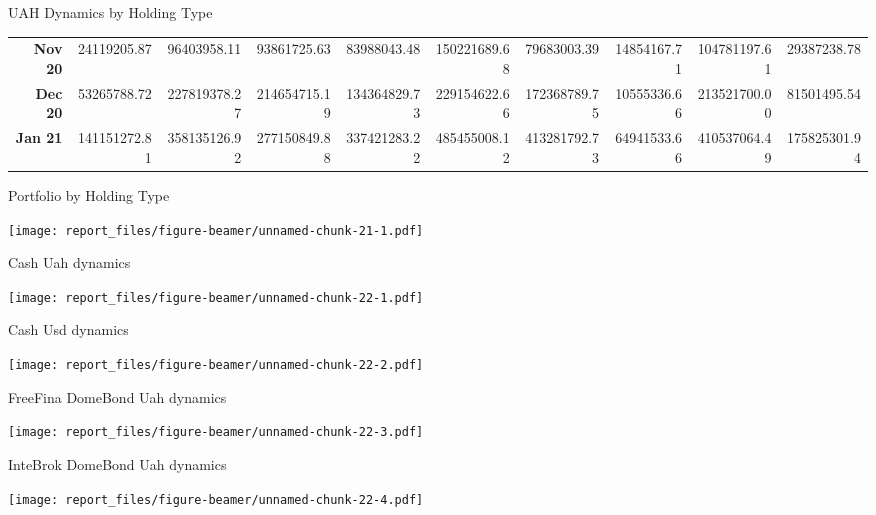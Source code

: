\documentclass[ignorenonframetext,]{beamer}
\begin{document}
\begin{frame}{UAH Dynamics by Holding Type}
\begin{table}[ht]
{\begin{tabular}{rrrrrrrrrr}
  {\textbf{Nov 20}} & 24119205.87 & 96403958.11 & 93861725.63 & 83988043.48 & 150221689.68 & 79683003.39 & 14854167.71 & 104781197.61 & 29387238.78 \\ 
  {\textbf{Dec 20}} & 53265788.72 & 227819378.27 & 214654715.19 & 134364829.73 & 229154622.66 & 172368789.75 & 10555336.66 & 213521700.00 & 81501495.54 \\ 
  {\textbf{Jan 21}} & 141151272.81 & 358135126.92 & 277150849.88 & 337421283.22 & 485455008.12 & 413281792.73 & 64941533.66 & 410537064.49 & 175825301.94 \\ 
   \hline
\end{tabular}
}
\end{table}

\end{frame}

\begin{frame}{Portfolio by Holding Type}
\protect\hypertarget{portfolio-by-holding-type}{}

\texttt{[image: report\_files/figure-beamer/unnamed-chunk-21-1.pdf]}

\end{frame}

\begin{frame}{Cash Uah dynamics}
\protect\hypertarget{cash-uah-dynamics}{}

\texttt{[image: report\_files/figure-beamer/unnamed-chunk-22-1.pdf]}

\end{frame}

\begin{frame}{Cash Usd dynamics}
\protect\hypertarget{cash-usd-dynamics}{}

\texttt{[image: report\_files/figure-beamer/unnamed-chunk-22-2.pdf]}

\end{frame}

\begin{frame}{FreeFina DomeBond Uah dynamics}
\protect\hypertarget{freefina-domebond-uah-dynamics-1}{}

\texttt{[image: report\_files/figure-beamer/unnamed-chunk-22-3.pdf]}

\end{frame}

\begin{frame}{InteBrok DomeBond Uah dynamics}
\protect\hypertarget{intebrok-domebond-uah-dynamics-1}{}

\texttt{[image: report\_files/figure-beamer/unnamed-chunk-22-4.pdf]}

\end{frame}
\end{document}
